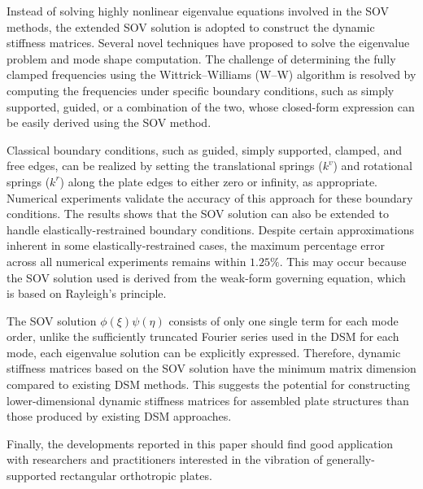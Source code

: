 \documentclass[preprint,12pt]{elsarticle}
\begin{document}
Instead of solving highly nonlinear eigenvalue equations involved in the SOV methods, the extended SOV solution is adopted to construct the dynamic stiffness matrices.
Several novel techniques have proposed to solve the eigenvalue problem and mode shape computation.
The challenge of determining the fully clamped frequencies using the Wittrick–Williams (W–W) algorithm is resolved by computing the frequencies under specific boundary conditions, such as simply supported, guided, or a combination of the two, whose closed-form expression can be easily derived using the SOV method.

Classical boundary conditions, such as guided, simply supported, clamped, and free edges, can be realized by setting the translational springs ($k^v$) and rotational springs ($k^r$) along the plate edges to either zero or infinity, as appropriate.  
Numerical experiments validate the accuracy of this approach for these boundary conditions.  
The results shows that the SOV solution can also be extended to handle elastically-restrained boundary conditions.
Despite certain approximations inherent in some elastically-restrained cases, the maximum percentage error across all numerical experiments remains within $1.25\%$. 
This may occur because the SOV solution used is derived from the weak-form governing equation, which is based on Rayleigh's principle.  

The SOV solution $\phi(\xi) \psi(\eta)$ consists of only one single term for each mode order, unlike the sufficiently truncated Fourier series used in the DSM for each mode, each eigenvalue solution can be explicitly expressed.
Therefore, dynamic stiffness matrices based on the SOV solution have the minimum matrix dimension compared to existing DSM methods. 
This suggests the potential for constructing lower-dimensional dynamic stiffness matrices for assembled plate structures than those produced by existing DSM approaches.

Finally, the developments reported in this paper should find good application with researchers and practitioners interested in the vibration of generally-supported rectangular orthotropic plates.
\end{document}
